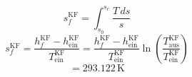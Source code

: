 

\item[b)] 
    \[
    s_{f}^{\text{KF}} = \int_{s_{0}}^{s_{e}} \frac{T \, ds}{s}
    \]
    \[
    s_{f}^{\text{KF}} = \frac{h_{f}^{\text{KF}} - h_{\text{ein}}^{\text{KF}}}{T_{\text{ein}}^{\text{KF}}} = \frac{h_{f}^{\text{KF}} - h_{\text{ein}}^{\text{KF}}}{T_{\text{ein}}^{\text{KF}}} \ln \left( \frac{T_{\text{aus}}^{\text{KF}}}{T_{\text{ein}}^{\text{KF}}} \right)
    \]
    \[
    = \boxed{293.122 \, \text{K}}
    \]